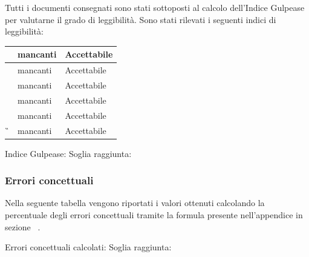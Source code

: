 Tutti i documenti consegnati sono stati sottoposti al calcolo dell'Indice Gulpease per valutarne il grado di leggibilità.
Sono stati rilevati i seguenti indici di leggibilità:

{
	\renewcommand{\arraystretch}{2}
	\centering
	\begin{tabular}{| c | C{3cm} | C{3cm} |}
			\hline
		\AdR{} &  mancanti & Accettabile \\
			\hline
		\NdP{} & mancanti & Accettabile\\
			\hline
		\SdF{} & mancanti & Accettabile\\ 
			\hline
		\PdP{} & mancanti & Accettabile \\
			\hline
		\PdQ{} & mancanti & Accettabile\\
			\hline
		\G{} & mancanti & Accettabile\\
			\hline
	 \end{tabular}
 
}

Indice Gulpease:
Soglia raggiunta:

\subsubsection{Errori concettuali}

Nella seguente tabella vengono riportati i valori ottenuti calcolando la percentuale degli errori concettuali tramite la formula presente nell'appendice in sezione ~.


Errori concettuali calcolati:
Soglia raggiunta:
